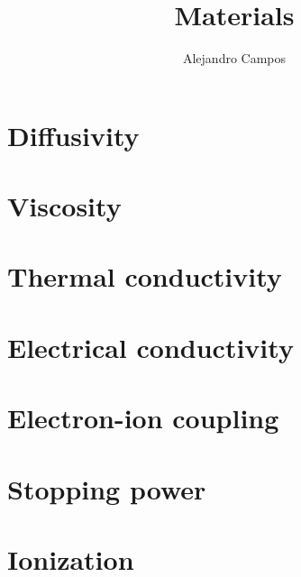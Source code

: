 \documentclass[a4paper,11pt]{report}
\title{Materials}
\author{Alejandro Campos}
\begin{document}
\maketitle
\tableofcontents

\chapter{Diffusivity}

\chapter{Viscosity}

\chapter{Thermal conductivity}

\chapter{Electrical conductivity}

\chapter{Electron-ion coupling}

\chapter{Stopping power}

\chapter{Ionization}
\end{document}
